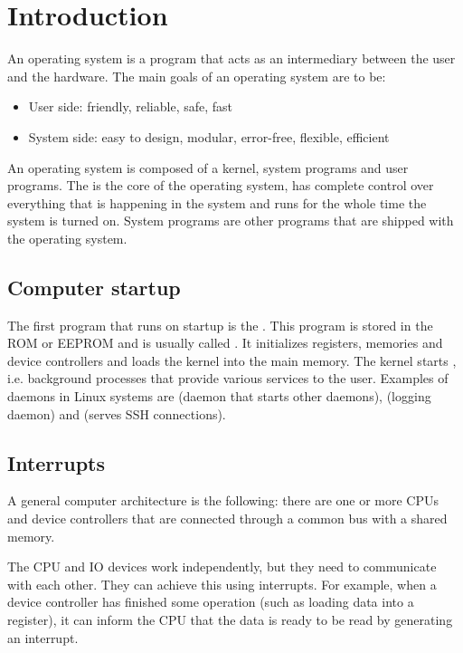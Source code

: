 \chapter{Introduction}

An operating system is a program that acts as an intermediary between the user and the hardware. The main goals of an operating system are to be:
\begin{itemize}
    \item User side: friendly, reliable, safe, fast
    \item System side: easy to design, modular, error-free, flexible, efficient
\end{itemize}

An operating system is composed of a kernel, system programs and user programs. The  is the core of the operating system, has complete control over everything that is happening in the system and runs for the whole time the system is turned on. System programs are other programs that are shipped with the operating system.

\section{Computer startup}

The first program that runs on startup is the . This program is stored in the ROM or EEPROM and is usually called
. It initializes registers, memories and device controllers and loads the kernel into the main memory. The kernel starts , i.e. background processes that provide various services to the user. Examples of daemons in Linux systems are  (daemon that starts other daemons),  (logging daemon) and  (serves SSH connections).

\section{Interrupts}

A general computer architecture is the following: there are one or more CPUs and device controllers that are connected through a common bus with a shared memory.


The CPU and IO devices work independently, but they need to communicate with
each other. They can achieve this using interrupts. For example, when a device
controller has finished some operation (such as loading data into a register),
it can inform the CPU that the data is ready to be read by generating an
interrupt.

